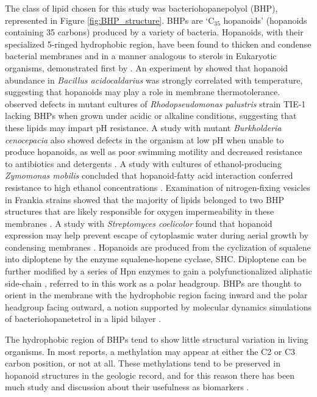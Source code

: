 The class of lipid chosen for this study was bacteriohopanepolyol (BHP), represented in Figure \ref{fig:BHP_structure}. BHPs are `C$_{35}$ hopanoids' (hopanoids containing 35 carbons) produced by a variety of bacteria. Hopanoids, with their specialized 5-ringed hydrophobic region, have been found to thicken and condense bacterial membranes and in a manner analogous to sterols in Eukaryotic organisms, demonstrated first by \cite{poralla1980glycolipid}. An experiment by \cite{poralla1984effect} showed that hopanoid abundance in \textit{Bacillus acidocaldarius} was strongly correlated with temperature, suggesting that hopanoids may play a role in membrane thermotolerance. \cite{welander2009hopanoids} observed defects in mutant cultures of \textit{Rhodopseudomonas palustris} strain TIE-1 lacking BHPs when grown under acidic or alkaline conditions, suggesting that these lipids may impart pH resistance. A study with mutant \textit{Burkholderia cenocepacia} also showed defects in the organism at low pH when unable to produce hopanoids, as well as poor swimming motility and decreased resistance to antibiotics and detergents \citep{schmerk2011hopanoid}. A study with cultures of ethanol-producing \textit{Zymomonas mobilis} concluded that hopanoid-fatty acid interaction conferred resistance to high ethanol concentrations \citep{bringer1985influence}. Examination of nitrogen-fixing vesicles in Frankia strains showed that the majority of lipids belonged to two BHP structures that are likely responsible for oxygen impermeability in these membranes \citep{berry1993hopanoid}. A study with \textit{Streptomyces coelicolor} found that hopanoid expression may help prevent escape of cytoplasmic water during aerial growth by condensing membranes \citep{poralla2000hopanoids}. Hopanoids are produced from the cyclization of squalene into diploptene by the enzyme squalene-hopene cyclase, SHC. Diploptene can be further modified by a series of Hpn enzymes to gain a polyfunctionalized aliphatic side-chain \citep{belin2018hopanoid, welander2012identification}, referred to in this work as a polar headgroup. BHPs are thought to orient in the membrane with the hydrophobic region facing inward and the polar headgroup facing outward, a notion supported by molecular dynamics simulations of bacteriohopanetetrol in a lipid bilayer \citep{poger2013relative}.

The hydrophobic region of BHPs tend to show little structural variation in living organisms. In most reports, a methylation may appear at either the C2 or C3 carbon position, or not at all. These methylations tend to be preserved in hopanoid structures in the geologic record, and for this reason there has been much study and discussion about their usefulness as biomarkers \citep[see review by][]{newman2016cellular}.

